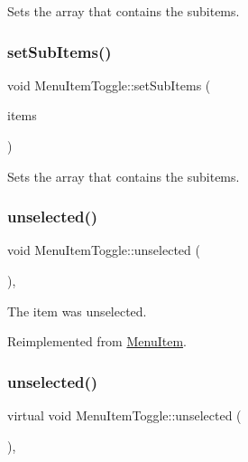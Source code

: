 Sets the array that contains the subitems. \mbox{\label{classMenuItemToggle_adf096428e8dce43a7e2870a8dc2d62fb}} 
\subsubsection{\texorpdfstring{set\+Sub\+Items()}{setSubItems()}\hspace{0.1cm}{\footnotesize\ttfamily [2/2]}}
{\footnotesize\ttfamily void Menu\+Item\+Toggle\+::set\+Sub\+Items (\begin{DoxyParamCaption}\item[{const \hyperlink{classVector}{Vector}$<$ \hyperlink{classMenuItem}{Menu\+Item} $\ast$$>$ \&}]{items }\end{DoxyParamCaption})\hspace{0.3cm}{\ttfamily [inline]}}

Sets the array that contains the subitems. \mbox{\label{classMenuItemToggle_a00dd7e523e262f4264ea1e73587a4b87}} 
\subsubsection{\texorpdfstring{unselected()}{unselected()}\hspace{0.1cm}{\footnotesize\ttfamily [1/2]}}
{\footnotesize\ttfamily void Menu\+Item\+Toggle\+::unselected (\begin{DoxyParamCaption}{ }\end{DoxyParamCaption})\hspace{0.3cm}{\ttfamily [override]}, {\ttfamily [virtual]}}

The item was unselected. 

Reimplemented from \hyperlink{classMenuItem_a3abeecc6d59ada50f4123e3e36ae4892}{Menu\+Item}.

\mbox{\label{classMenuItemToggle_a38e606a195f699ea8bb839e1a2ae6565}} 
\subsubsection{\texorpdfstring{unselected()}{unselected()}\hspace{0.1cm}{\footnotesize\ttfamily [2/2]}}
{\footnotesize\ttfamily virtual void Menu\+Item\+Toggle\+::unselected (\begin{DoxyParamCaption}{ }\end{DoxyParamCaption})\hspace{0.3cm}{\ttfamily [override]}, {\ttfamily [virtual]}}


